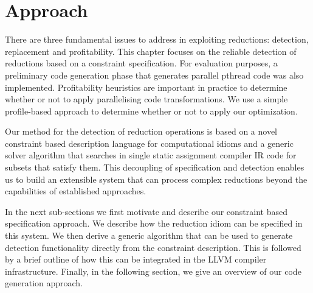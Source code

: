 

\section{Approach}

    There are three fundamental issues to address in exploiting reductions:
    detection, replacement and profitability.
    This chapter focuses on the reliable detection of reductions based on a
    constraint specification.
    For evaluation purposes, a preliminary code generation phase that generates
    parallel pthread code was also implemented.
    Profitability heuristics are important in practice to determine whether or
    not to apply parallelising code transformations.
    We use a simple profile-based
    approach to determine whether or not to apply our optimization.

    Our method for the detection of reduction operations is based on a novel
    constraint based description language for computational idioms and a generic
    solver algorithm that searches in single static assignment compiler IR code
    for subsets that satisfy them.
    This decoupling of specification and detection enables us to build an
    extensible system that can process complex reductions beyond the
    capabilities of established approaches.

    In the next sub-sections we first motivate and describe our constraint based
    specification approach.
    We describe how the reduction idiom can be specified in this system.
    We then derive a generic algorithm that can be used to generate detection
    functionality directly from the constraint description.
    This is followed by a brief outline of how this can be integrated in the
    LLVM compiler infrastructure.
    Finally, in the following section, we give an overview of our code
    generation approach.

